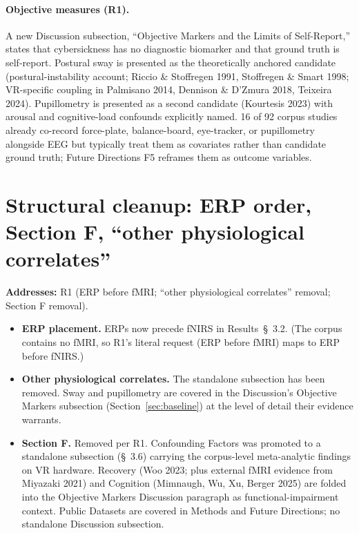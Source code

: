 \documentclass[11pt,a4paper]{article}
\newcommand{\addresses}[1]{\par\noindent\textbf{\small Addresses:} {\small #1}\par\smallskip}
\begin{document}
\paragraph{Objective measures (R1).} A new Discussion subsection, ``Objective Markers and the Limits of Self-Report,'' states that cybersickness has no diagnostic biomarker and that ground truth is self-report. Postural sway is presented as the theoretically anchored candidate (postural-instability account; Riccio \& Stoffregen 1991, Stoffregen \& Smart 1998; VR-specific coupling in Palmisano 2014, Dennison \& D'Zmura 2018, Teixeira 2024). Pupillometry is presented as a second candidate (Kourtesis 2023) with arousal and cognitive-load confounds explicitly named. 16 of 92 corpus studies already co-record force-plate, balance-board, eye-tracker, or pupillometry alongside EEG but typically treat them as covariates rather than candidate ground truth; Future Directions F5 reframes them as outcome variables.

\section{Structural cleanup: ERP order, Section F, ``other physiological correlates''}\label{sec:structure}
\addresses{R1 (ERP before fMRI; ``other physiological correlates'' removal; Section F removal).}

\begin{itemize}
  \item \textbf{ERP placement.} ERPs now precede fNIRS in Results~\S~3.2. (The corpus contains no fMRI, so R1's literal request (ERP before fMRI) maps to ERP before fNIRS.)
  \item \textbf{Other physiological correlates.} The standalone subsection has been removed. Sway and pupillometry are covered in the Discussion's Objective Markers subsection (Section~\ref{sec:baseline}) at the level of detail their evidence warrants.
  \item \textbf{Section F.} Removed per R1. Confounding Factors was promoted to a standalone subsection (\S~3.6) carrying the corpus-level meta-analytic findings on VR hardware. Recovery (Woo 2023; plus external fMRI evidence from Miyazaki 2021) and Cognition (Mimnaugh, Wu, Xu, Berger 2025) are folded into the Objective Markers Discussion paragraph as functional-impairment context. Public Datasets are covered in Methods and Future Directions; no standalone Discussion subsection.
\end{itemize}
\end{document}
